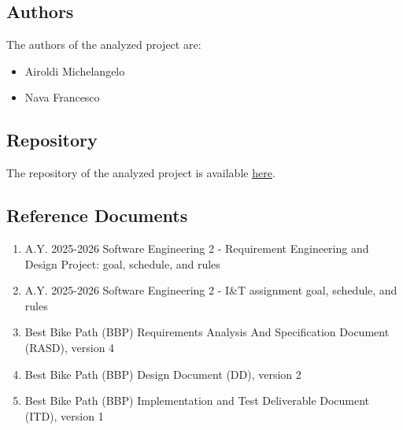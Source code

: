\subsection{Authors}
The authors of the analyzed project are:
\begin{itemize}
    \item Airoldi Michelangelo
    \item Nava Francesco
\end{itemize}

\subsection{Repository}
The repository of the analyzed project is available \href{https://github.com/Ajroldi/AiroldiNava}{here}.

\subsection{Reference Documents}
\begin{enumerate}
    \item A.Y. 2025-2026 Software Engineering 2 - Requirement Engineering and Design Project: goal, schedule, and rules \cite{project_spec}
    \item A.Y. 2025-2026 Software Engineering 2 - I\&T assignment goal, schedule, and rules \cite{project_spec2}
    \item Best Bike Path (BBP) Requirements Analysis And Specification Document (RASD), version 4 \cite{Analyzed_RASD}
    \item Best Bike Path (BBP) Design Document (DD), version 2 \cite{Analyzed_DD}
    \item Best Bike Path (BBP) Implementation and Test Deliverable Document (ITD), version 1 \cite{Analyzed_ITD}
\end{enumerate}